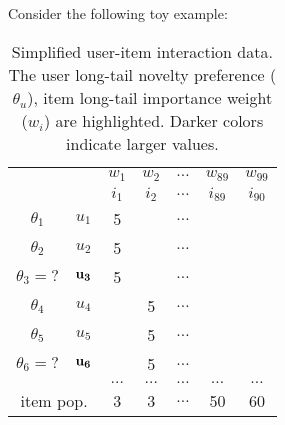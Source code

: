 Consider  the following toy example:
\vspace{-0.2cm}
\begin{table}[htb]
\centering
\scriptsize
\begin{tabular}{ccccccc} 
& & \cellcolor{blue!35}$w_1$ &\cellcolor{blue!18} $w_2$ & $\dots$ &\cellcolor{blue!8} $w_{89}$  &\cellcolor{blue!8} $w_{99}$   
\\
&   &$i_1$&$i_2$&$\dots$&$i_{89}$&$i_{90}$\\ 
\cmidrule(r){3-7} 	 
\cellcolor{red!35}$\theta_1$  &$u_1 $   &5 &   & $\dots$ &  &   \\
\cellcolor{red!28}$\theta_2$  &$u_2$     &5 &    & $\dots$ &  &  \\
 $\theta_3=?$  &$\bf u_3$  &5 &  &   $\dots$ &  &  \\
\cellcolor{red!10}$\theta_4$ & $u_4$  &  &5   & $\dots$ & &\\ 
\cellcolor{red!10}$\theta_5$ & $u_5$  &  & 5  & $\dots$ & &\\ 
$\theta_6=?$  & $\bf u_6$ & &5  &      $\dots$& &  \\ 
 & & $\hdots$  &$\hdots$   &$\hdots$   &$\hdots$   &$\hdots$  \\
\cmidrule(r){3-7} 	 
\multicolumn{2}{c}{item pop.}  & 3  & 3  & $\dots$ &50&60\\  
\end{tabular}
\caption{Simplified user-item interaction data. The user long-tail novelty preference ($\theta_u$), item long-tail importance weight ($w_i$) are highlighted. Darker colors indicate larger values. } \label{tab:example}
\end{table} 
\vspace{-0.2cm}
